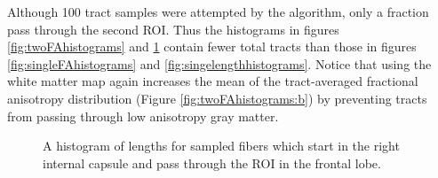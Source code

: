 Although 100 tract samples were attempted by the algorithm, only a fraction pass through the second ROI.  Thus the histograms in figures \ref{fig:twoFAhistograms} and \ref{fig:twolengthhistograms} contain fewer total tracts than those in figures \ref{fig:singleFAhistograms} and \ref{fig:singelengthhistograms}.  Notice that using the white matter map again increases the mean of the tract-averaged fractional anisotropy distribution (Figure \ref{fig:twoFAhistograms:b}) by preventing tracts from passing through low anisotropy gray matter.

\begin{figure}
	\caption{A histogram of lengths for sampled fibers which start in the right internal capsule and pass through the ROI in the frontal lobe. }
	\label{fig:twolengthhistograms}
\end{figure}

